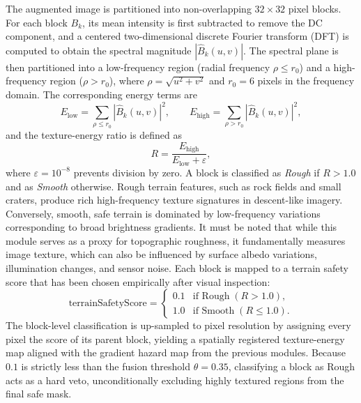 \documentclass{article}
\begin{document}
The augmented image is partitioned into non-overlapping $32 \times 32$ pixel blocks. For each block $B_k$, its mean intensity is first subtracted to remove the DC component, and a centered two-dimensional discrete Fourier transform (DFT) is computed to obtain the spectral magnitude $|\hat{B}_k(u,v)|$. The spectral plane is then partitioned into a low-frequency region (radial frequency $\rho \leq r_0$) and a high-frequency region ($\rho > r_0$), where $\rho = \sqrt{u^2 + v^2}$ and $r_0 = 6$ pixels in the frequency domain. The corresponding energy terms are
\begin{equation}
    E_{\text{low}}  = \sum_{\rho \leq r_0} |\hat{B}_k(u,v)|^2, \qquad
    E_{\text{high}} = \sum_{\rho >   r_0} |\hat{B}_k(u,v)|^2,
\end{equation}
and the texture-energy ratio is defined as
\begin{equation}
    R = \frac{E_{\text{high}}}{E_{\text{low}} + \varepsilon},
\end{equation}
where $\varepsilon = 10^{-8}$ prevents division by zero. A block is classified as \emph{Rough} if $R > 1.0$ and as \emph{Smooth} otherwise. Rough terrain features, such as rock fields and small craters, produce rich high-frequency texture signatures in descent-like imagery. Conversely, smooth, safe terrain is dominated by low-frequency variations corresponding to broad brightness gradients. It must be noted that while this module serves as a proxy for topographic roughness, it fundamentally measures image texture, which can also be influenced by surface albedo variations, illumination changes, and sensor noise. Each block is mapped to a terrain safety score that has been chosen empirically after visual inspection:
\begin{equation}
    \text{terrainSafetyScore} =
    \begin{cases}
        0.1 & \text{if Rough} \; (R > 1.0), \\
        1.0 & \text{if Smooth} \; (R \leq 1.0).
    \end{cases}
\end{equation}
The block-level classification is up-sampled to pixel resolution by assigning every pixel the score of its parent block, yielding a spatially registered texture-energy map aligned with the gradient hazard map from the previous modules. Because $0.1$ is strictly less than the fusion threshold $\theta = 0.35$, classifying a block as Rough acts as a hard veto, unconditionally excluding highly textured regions from the final safe mask.
\end{document}
